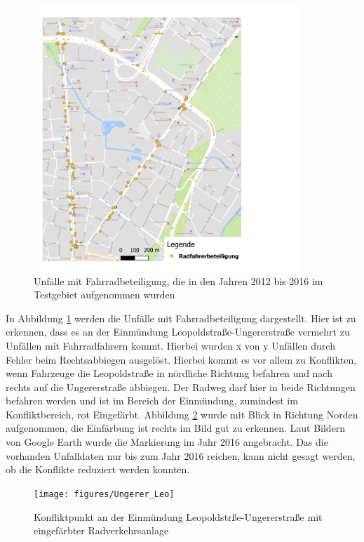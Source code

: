 \begin{savenotes}
	\begin{figure}[H]
		\centering
		\includegraphics[width=10cm,height=10cm]{figures/map_radfahrer}
		\caption[Unfälle mit Fahrradbeteiligung, die in den Jahren 2012 bis 2016 im Testgebiet aufgenommen wurden]{Unfälle mit Fahrradbeteiligung, die in den Jahren 2012 bis 2016 im Testgebiet aufgenommen wurden}\label{fig:map_radfahrer}
	\end{figure}
\end{savenotes}

In Abbildung \ref{fig:map_radfahrer} werden die Unfälle mit Fahrradbeteiligung dargestellt. Hier ist zu erkennen, dass es an der Einmündung Leopoldstraße-Ungererstraße vermehrt zu Unfällen mit Fahrradfahrern kommt. Hierbei wurden x von y Unfällen durch Fehler beim Rechtsabbiegen ausgelöst. Hierbei kommt es vor allem zu Konflikten, wenn Fahrzeuge die Leopoldstraße in nördliche Richtung befahren und nach rechts auf die Ungererstraße abbiegen. Der Radweg darf hier in beide Richtungen befahren werden und ist im Bereich der Einmündung, zumindest im Konfliktbereich, rot Eingefärbt. Abbildung \ref{fig:Konflikt_Ungerer_Leo} wurde mit Blick in Richtung Norden aufgenommen, die Einfärbung ist rechts im Bild gut zu erkennen. Laut Bildern von Google Earth wurde die Markierung im Jahr 2016 angebracht. Das die vorhanden Unfalldaten nur bis zum Jahr 2016 reichen, kann nicht gesagt werden, ob die Konflikte reduziert werden konnten.

\begin{savenotes}
	\begin{figure}[H]
		\centering
		\texttt{[image: figures/Ungerer\_Leo]}
		\caption[Konfliktpunkt an der Einmündung Leopoldstrße-Ungererstraße mit eingefärbter Radverkehrsanlage]{Konfliktpunkt an der Einmündung Leopoldstrße-Ungererstraße mit eingefärbter Radverkehrsanlage}\label{fig:Konflikt_Ungerer_Leo}
	\end{figure}
\end{savenotes}

